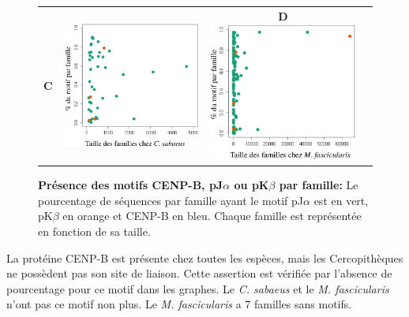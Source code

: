\documentclass[12pt,a4paper]{article}
\begin{document}
\begin{figure}
\begin{tabular}{cccc}
		\textbf{C} & \includegraphics[scale=0.3]{img/motif_sabaeus.png} & \textbf{D} \includegraphics[scale=0.3]{img/motif_fascicularis.png} \\
	\end{tabular}
	\caption{\textbf{Présence des motifs CENP-B, pJ$\alpha$ ou pK$\beta$ par famille:}
	Le pourcentage de séquences par famille ayant le motif pJ$\alpha$ est en vert, pK$\beta$ en orange et CENP-B en bleu. Chaque famille est représentée en fonction de sa taille.
	\label{fig:motif}
		} 
\end{figure}			
			La protéine CENP-B est présente chez toutes les espèces, mais les Cercopithèques ne possèdent pas son site de liaison. Cette assertion est vérifiée par l'absence de pourcentage pour ce motif dans les graphes. Le \textit{C. sabaeus} et le \textit{M. fascicularis} n'ont pas ce motif non plus. Le \textit{M. fascicularis} a 7 familles sans motifs.
			
\end{document}
